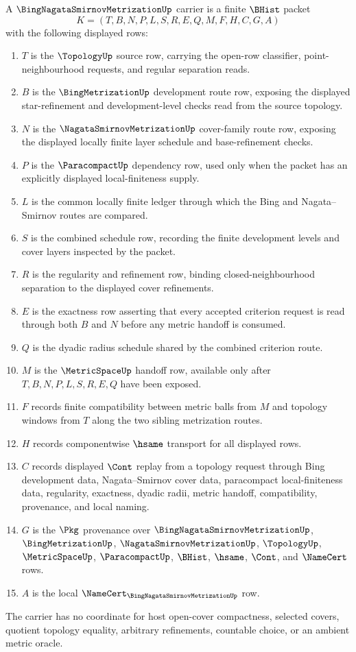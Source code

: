 \begin{definition}
\label{def:bing-nagata-smirnov-metrization-carrier}
A $\BingNagataSmirnovMetrizationUp$ carrier is a finite $\BHist$ packet
$$
K=(T,B,N,P,L,S,R,E,Q,M,F,H,C,G,A)
$$
with the following displayed rows:
\begin{enumerate}
\item $T$ is the $\TopologyUp$ source row, carrying the open-row classifier, point-neighbourhood requests, and regular separation reads.
\item $B$ is the $\BingMetrizationUp$ development route row, exposing the displayed star-refinement and development-level checks read from the source topology.
\item $N$ is the $\NagataSmirnovMetrizationUp$ cover-family route row, exposing the displayed locally finite layer schedule and base-refinement checks.
\item $P$ is the $\ParacompactUp$ dependency row, used only when the packet has an explicitly displayed local-finiteness supply.
\item $L$ is the common locally finite ledger through which the Bing and Nagata--Smirnov routes are compared.
\item $S$ is the combined schedule row, recording the finite development levels and cover layers inspected by the packet.
\item $R$ is the regularity and refinement row, binding closed-neighbourhood separation to the displayed cover refinements.
\item $E$ is the exactness row asserting that every accepted criterion request is read through both $B$ and $N$ before any metric handoff is consumed.
\item $Q$ is the dyadic radius schedule shared by the combined criterion route.
\item $M$ is the $\MetricSpaceUp$ handoff row, available only after $T,B,N,P,L,S,R,E,Q$ have been exposed.
\item $F$ records finite compatibility between metric balls from $M$ and topology windows from $T$ along the two sibling metrization routes.
\item $H$ records componentwise $\hsame$ transport for all displayed rows.
\item $C$ records displayed $\Cont$ replay from a topology request through Bing development data, Nagata--Smirnov cover data, paracompact local-finiteness data, regularity, exactness, dyadic radii, metric handoff, compatibility, provenance, and local naming.
\item $G$ is the $\Pkg$ provenance over $\BingNagataSmirnovMetrizationUp$, $\BingMetrizationUp$, $\NagataSmirnovMetrizationUp$, $\TopologyUp$, $\MetricSpaceUp$, $\ParacompactUp$, $\BHist$, $\hsame$, $\Cont$, and $\NameCert$ rows.
\item $A$ is the local $\NameCert_{\BingNagataSmirnovMetrizationUp}$ row.
\end{enumerate}
The carrier has no coordinate for host open-cover compactness, selected covers, quotient topology equality, arbitrary refinements, countable choice, or an ambient metric oracle.
\end{definition}

